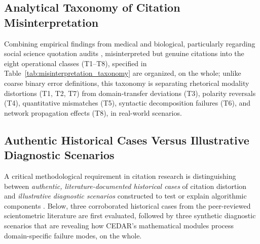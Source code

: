 \documentclass[journal]{IEEEtran}
\begin{document}
\subsection{Analytical Taxonomy of Citation Misinterpretation}
Combining empirical findings from medical and biological, particularly regarding social science quotation audits \cite{delacey1985accurate,greenberg2009citation,harzing2002referencing,jergas2015quotation,mogull2017accuracy,pavlovic2021accurate,smith2020quotation}, misinterpreted but genuine citations into the eight operational classes (T1--T8), specified in Table~\ref{tab:misinterpretation_taxonomy} are organized, on the whole; unlike coarse binary error definitions, this taxonomy is separating rhetorical modality distortions (T1, T2, T7) from domain-transfer deviations (T3), polarity reversals (T4), quantitative mismatches (T5), syntactic decomposition failures (T6), and network propagation effects (T8), in real-world scenarios.

\subsection{Authentic Historical Cases Versus Illustrative Diagnostic Scenarios}
A critical methodological requirement in citation research is distinguishing between \emph{authentic, literature-documented historical cases} of citation distortion and \emph{illustrative diagnostic scenarios} constructed to test or explain algorithmic components \cite{rekdal2014sinking,rekdal2014urban}. Below, three corroborated historical cases from the peer-reviewed scientometric literature are first evaluated, followed by three synthetic diagnostic scenarios that are revealing how CEDAR's mathematical modules process domain-specific failure modes, on the whole.
\end{document}
